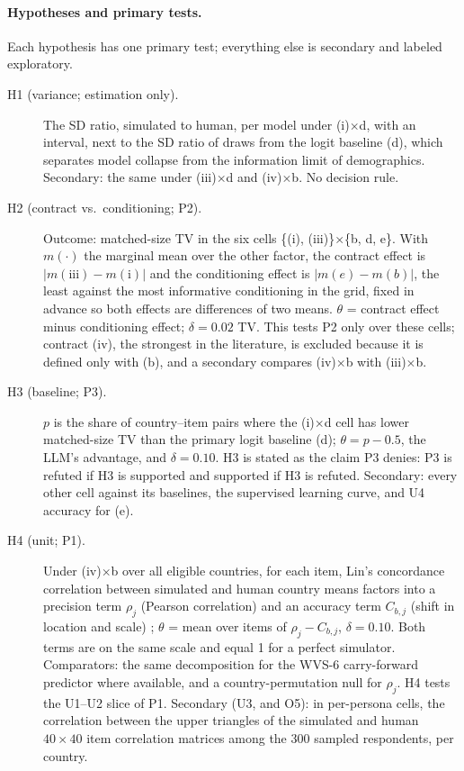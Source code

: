 \documentclass[11pt]{article}
\begin{document}
\paragraph{Hypotheses and primary tests.} Each hypothesis has one primary test; everything else is secondary and labeled exploratory.
\begin{description}
  \item[H1 (variance; estimation only).] The SD ratio, simulated to human, per model under (i)$\times$d, with an interval, next to the SD ratio of draws from the logit baseline (d), which separates model collapse from the information limit of demographics. Secondary: the same under (iii)$\times$d and (iv)$\times$b. No decision rule.
  \item[H2 (contract vs.\ conditioning; P2).] Outcome: matched-size TV in the six cells \{(i), (iii)\}$\times$\{b, d, e\}. With $m(\cdot)$ the marginal mean over the other factor, the contract effect is $|m(\text{iii}) - m(\text{i})|$ and the conditioning effect is $|m(e) - m(b)|$, the least against the most informative conditioning in the grid, fixed in advance so both effects are differences of two means. $\theta$ = contract effect minus conditioning effect; $\delta = 0.02$ TV. This tests P2 only over these cells; contract (iv), the strongest in the literature, is excluded because it is defined only with (b), and a secondary compares (iv)$\times$b with (iii)$\times$b.
  \item[H3 (baseline; P3).] $p$ is the share of country--item pairs where the (i)$\times$d cell has lower matched-size TV than the primary logit baseline (d); $\theta = p - 0.5$, the LLM's advantage, and $\delta = 0.10$. H3 is stated as the claim P3 denies: P3 is refuted if H3 is supported and supported if H3 is refuted. Secondary: every other cell against its baselines, the supervised learning curve, and U4 accuracy for (e).
  \item[H4 (unit; P1).] Under (iv)$\times$b over all eligible countries, for each item, Lin's concordance correlation between simulated and human country means factors into a precision term $\rho_j$ (Pearson correlation) and an accuracy term $C_{b,j}$ (shift in location and scale) \citep{lin1989}; $\theta$ = mean over items of $\rho_j - C_{b,j}$, $\delta = 0.10$. Both terms are on the same scale and equal 1 for a perfect simulator. Comparators: the same decomposition for the WVS-6 carry-forward predictor where available, and a country-permutation null for $\rho_j$. H4 tests the U1--U2 slice of P1. Secondary (U3, and O5): in per-persona cells, the correlation between the upper triangles of the simulated and human $40 \times 40$ item correlation matrices among the 300 sampled respondents, per country.

\end{description}
\end{document}
